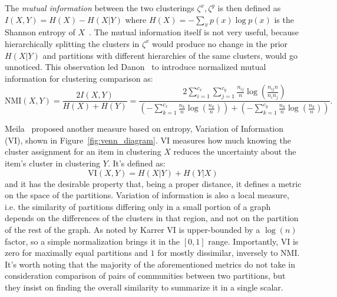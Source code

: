 \documentclass[11pt,              a4paper,              twoside,openright,              titlepage,              headinclude,footinclude,                            numbers=noenddot,              cleardoublepage=empty,]{scrreprt}
\begin{document}
The \emph{mutual information} between the two clusterings $\zeta^x,\zeta^y$ is then defined as $I(X,Y)=H(X) - H(X|Y)$ where $H(X)=-\sum_x p(x) \log p(x)$ is the Shannon entropy of $X$~\cite{cover2006}.
The mutual information itself is not very useful, because hierarchically splitting the clusters in $\zeta^x$ would produce no change in the prior $H(X|Y)$ and partitions with different hierarchies of the same clusters, would go unnoticed.
This observation led Danon~\cite{danon2005} to introduce normalized mutual information for clustering comparison as: 
\begin{equation}\label{eq:nmi}
\textrm{NMI}(X,Y) = \frac{2I(X,Y)}{H(X)+H(Y)} = \dfrac{2\sum \limits_{i=1}^{c_x} \sum \limits_{j=1}^{c_y} \frac{n_{ij}}{n} \log\left( \frac{n_{ij}n}{n_i n_j} \right)} {\left(-\sum \limits_{k=1}^{c_x} \frac{n_k}{n}\log\left(\frac{n_k}{n}\right) \right) + \left(-\sum \limits_{k=1}^{c_y} \frac{n_k}{n}\log\left(\frac{n_k}{n}\right) \right)}.
\end{equation}

Meila~\cite{meila2007} proposed another measure based on entropy, Variation of Information (VI), shown in Figure~\ref{fig:venn_diagram}.
VI measures how much knowing the cluster assignment for an item in clustering $X$ reduces the uncertainty about the item's cluster in clustering $Y$.
It's defined as:
\begin{equation}\label{eq:vi}
\textrm{VI}(X,Y) = H(X|Y) + H(Y|X)
\end{equation}
and it has the desirable property that, being a proper distance, it defines a metric on the space of the partitions.
Variation of information is also a local measure, i.e. the similarity of partitions differing only in a small portion of a graph depends on the differences of the clusters in that region, and not on the partition of the rest of the graph.
As noted by Karrer \cite{karrer2008} VI is upper-bounded by a $\log(n)$ factor, so a simple normalization brings it in the $[0,1]$ range.
Importantly, VI is zero for maximally equal partitions and $1$ for mostly dissimilar, inversely to NMI.
It's worth noting that the majority of the aforementioned metrics do not take in consideration comparison of pairs of communities between two partitions, but they insist on finding the overall similarity to summarize it in a single scalar.
\end{document}
